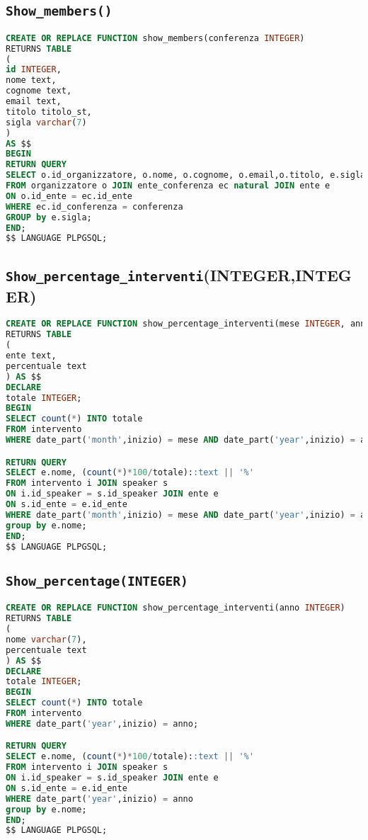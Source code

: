 \subsection{\texttt{Show\_members()}}
\begin{lstlisting}[language=SQL,style=mystyle]
CREATE OR REPLACE FUNCTION show_members(conferenza INTEGER)
RETURNS TABLE 
(
id INTEGER, 
nome text, 
cognome text, 
email text,
titolo titolo_st, 
sigla varchar(7)
) 
AS $$
BEGIN
RETURN QUERY
SELECT o.id_organizzatore, o.nome, o.cognome, o.email,o.titolo, e.sigla
FROM organizzatore o JOIN ente_conferenza ec natural JOIN ente e  
ON o.id_ente = ec.id_ente
WHERE ec.id_conferenza = conferenza
GROUP by e.sigla;
END;
$$ LANGUAGE PLPGSQL;
\end{lstlisting}
\subsection{\texttt{Show\_percentage\_interventi}(INTEGER,INTEGER)}
\begin{lstlisting}[language=SQL,style=mystyle]
CREATE OR REPLACE FUNCTION show_percentage_interventi(mese INTEGER, anno INTEGER)
RETURNS TABLE
(
ente text,
percentuale text
) AS $$
DECLARE
totale INTEGER;
BEGIN
SELECT count(*) INTO totale
FROM intervento
WHERE date_part('month',inizio) = mese AND date_part('year',inizio) = anno;

RETURN QUERY
SELECT e.nome, (count(*)*100/totale)::text || '%'
FROM intervento i JOIN speaker s 
ON i.id_speaker = s.id_speaker JOIN ente e 
ON s.id_ente = e.id_ente
WHERE date_part('month',inizio) = mese AND date_part('year',inizio) = anno
group by e.nome;
END;
$$ LANGUAGE PLPGSQL;
\end{lstlisting}
\subsection{\texttt{Show\_percentage(INTEGER)}}
\begin{lstlisting}[language=SQL,style=mystyle]
CREATE OR REPLACE FUNCTION show_percentage_interventi(anno INTEGER)
RETURNS TABLE
(
nome varchar(7),
percentuale text
) AS $$
DECLARE
totale INTEGER;
BEGIN
SELECT count(*) INTO totale
FROM intervento
WHERE date_part('year',inizio) = anno;

RETURN QUERY
SELECT e.nome, (count(*)*100/totale)::text || '%'
FROM intervento i JOIN speaker s 
ON i.id_speaker = s.id_speaker JOIN ente e 
ON s.id_ente = e.id_ente
WHERE date_part('year',inizio) = anno
group by e.nome;
END;
$$ LANGUAGE PLPGSQL;
\end{lstlisting}
